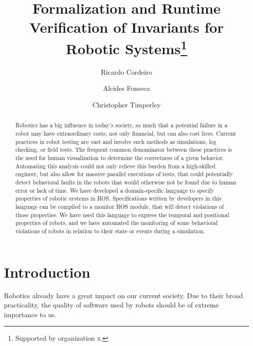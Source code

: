 \documentclass[runningheads]{llncs}
\begin{document}
%
\title{Formalization and Runtime Verification of Invariants for
Robotic Systems\thanks{Supported by organization x.}}
%
%
\author{Ricardo Cordeiro \and
Alcides Fonseca \and
Christopher Timperley}
%
%
%
\maketitle              %
%
\begin{abstract}
    Robotics has a big influence in today's society, so much that a potential failure in a robot may have extraordinary costs, not only financial, but can also cost lives.
    Current practices in robot testing are vast and involve such methods as simulations, log checking, or field tests. The frequent common denominator between these practices is the need for human visualization to determine the correctness of a given behavior. Automating this analysis could not only relieve this burden from a high-skilled engineer, but also allow for massive parallel executions of tests, that could potentially detect behavioral faults in the robots that would otherwise not be found due to human error or lack of time.
    We have developed a domain-specific language to specify properties of robotic systems in ROS. Specifications written by developers in this language can be compiled to a monitor ROS module, that will detect violations of those properties. We have used this language to express the temporal and positional properties of robots, and we have automated the monitoring of some behavioral violations of robots in relation to their state or events during a simulation.

\end{abstract}
%
%
%
\section{Introduction}

Robotics already have a great impact on our current society. Due to their broad practicality, the quality of software used by robots should be of extreme importance to us.
\end{document}
